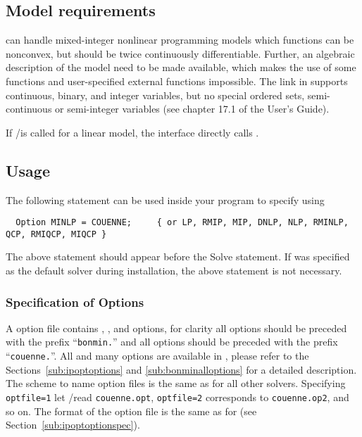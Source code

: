 \subsection{Model requirements}

\COUENNE can handle mixed-integer nonlinear programming models which functions can be nonconvex, but should be twice continuously differentiable. Further, an algebraic description of the model need to be made available, which makes the use of some \GAMS functions and user-specified external functions impossible.
The \COUENNE link in \GAMS supports continuous, binary, and integer variables, but no special ordered sets, semi-continuous or semi-integer variables (see chapter 17.1 of the \GAMS User's Guide).

If \GAMS/\COUENNE is called for a linear model, the interface directly calls \CBC.

\subsection{Usage}

The following statement can be used inside your \GAMS program to specify using \COUENNE
\begin{verbatim}
  Option MINLP = COUENNE;     { or LP, RMIP, MIP, DNLP, NLP, RMINLP, QCP, RMIQCP, MIQCP }
\end{verbatim}

The above statement should appear before the Solve statement.
If \COUENNE was specified as the default solver during \GAMS installation, the above statement is not necessary.

\subsubsection{Specification of Options}

A \COUENNE option file contains \IPOPT, \BONMIN, and \COUENNE options, for clarity all \BONMIN options should be preceded with the prefix ``\texttt{bonmin.}'' and all \COUENNE options should be preceded with the prefix ``\texttt{couenne.}''.
All \IPOPT and many \BONMIN options are available in \COUENNE, please refer to the Sections~\ref{sub:ipoptoptions} and \ref{sub:bonminalloptions} for a detailed description.
The scheme to name option files is the same as for all other \GAMS solvers.
Specifying \texttt{optfile=1} let \GAMS/\COUENNE read \texttt{couenne.opt}, \texttt{optfile=2} corresponds to \texttt{couenne.op2}, and so on.
The format of the option file is the same as for \IPOPT (see Section~\ref{sub:ipoptoptionspec}).

